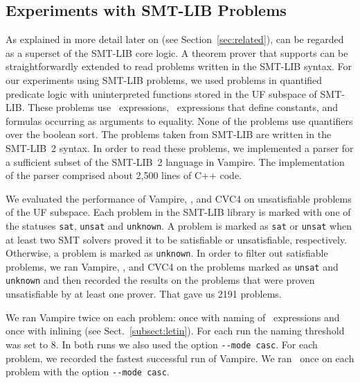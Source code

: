 \subsection{Experiments with SMT-LIB Problems}\label{subsec:SMT}

As explained in more detail later on (see Section~\ref{sec:related}), \folb{} can be regarded as a superset of the SMT-LIB core logic.
A theorem prover that supports \folb{} can be straightforwardly extended to read problems written in the SMT-LIB syntax.
%
For our experiments using SMT-LIB problems, we used problems in quantified predicate logic with uninterpreted functions stored in the UF subspace of SMT-LIB.
These problems use \ITE\ expressions, \LETIN\ expressions that define constants, and formulas 
occurring as arguments to equality. None of the problems use quantifiers over the boolean sort. 
 The  problems taken from SMT-LIB are written in the SMT-LIB~2
 syntax. In order to read these problems, we implemented a parser for
 a sufficient subset of the SMT-LIB~2 language in Vampire. The
 implementation of the parser comprised about 2,500 lines of C++ code. 

We evaluated the performance of Vampire, \oldcnfVampire, and CVC4 on unsatisfiable problems of the UF subspace. Each problem in the SMT-LIB library is marked with one of the statuses \verb'sat', \verb'unsat' and \verb'unknown'. A problem is marked as \verb'sat' or \verb'unsat' 
when at least two SMT solvers proved it to be satisfiable or unsatisfiable, respectively.
Otherwise, a problem is marked as \verb'unknown'. In order to filter out satisfiable problems,
we ran Vampire, \oldcnfVampire, and CVC4 on the problems marked as \verb'unsat' and \verb'unknown' and then recorded the results on the problems that were proven unsatisfiable by at least one prover. That gave us 2191 problems.


We ran Vampire twice on each problem: once with naming of \LETIN\ expressions and once with inlining (see Sect.~\ref{subsect:letin}).
For each run the naming threshold was set to 8. In both runs we also used the option \verb'--mode casc'. For each problem, we recorded the fastest successful run of Vampire. We ran \oldcnfVampire\ once on each problem with the option \verb'--mode casc'.

